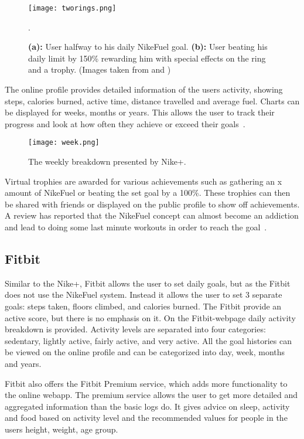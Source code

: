 \begin{figure}[h!]
	\centering
		\texttt{[image: tworings.png]}
		\caption{\footnotesize \textbf{(a):} User halfway to his daily NikeFuel goal. \textbf{(b):} User beating his daily limit by 150\% rewarding him with special effects on the ring and a trophy. (Images taken from \cite{fuelbandDcRain} and \cite{fuelbandTechSpce})}.
		\label{fig:tworings}
\end{figure}

The online profile provides detailed information of the users activity, showing steps, calories burned, active time, distance travelled and average fuel. Charts can be displayed for weeks, months or years. This allows the user to track their progress and look at how often they achieve or exceed their goals~\cite{fuelbandTechSpce}. 

\begin{figure}[h!]
	\centering
		\texttt{[image: week.png]}
		\caption{\footnotesize The weekly breakdown presented by Nike+. \cite{fuelbandTechSpce}}
		\label{fig:activityBreakdown}
\end{figure}

Virtual trophies are awarded for various achievements such as gathering an x amount of NikeFuel or beating the set goal by a 100\%. These trophies can then be shared with friends or displayed on the public profile to show off achievements. A review has reported that the NikeFuel concept can almost become an addiction and lead to doing some last minute workouts in order to reach the goal~\cite{fuelbandDcRain}.

\subsection{Fitbit}
Similar to the Nike+, Fitbit \cite{fitBit} allows the user to set daily goals, but as the Fitbit does not use the NikeFuel system. Instead it allows the user to set 3 separate goals: steps taken, floors climbed, and calories burned. The Fitbit provide an active score, but there is no emphasis on it. On the Fitbit-webpage daily activity breakdown is provided. Activity levels are separated into four categories: sedentary, lightly active, fairly active, and very active. All the goal histories can be viewed on the online profile and can be categorized into day, week, months and years. 

Fitbit also offers the Fitbit Premium service, which adds more functionality to the online webapp. The premium service allows the user to get more detailed and aggregated information than the basic logs do. It gives advice on sleep, activity and food based on activity level and the recommended values for people in the users height, weight, age group.


